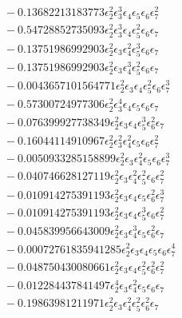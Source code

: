 \documentclass[10pt]{article}
\begin{document}
\begin{align*}
&{}  - 0.13682213183773 \epsilon_{2}^{2} \epsilon_{3}^{3} \epsilon_{4} \epsilon_{5} \epsilon_{6} \epsilon_{7}^{2} \\
&{}  - 0.54728852735093 \epsilon_{2}^{2} \epsilon_{3}^{3} \epsilon_{4} \epsilon_{5}^{2} \epsilon_{6} \epsilon_{7} \\
&{}  - 0.13751986992903 \epsilon_{2}^{2} \epsilon_{3} \epsilon_{4}^{2} \epsilon_{5}^{3} \epsilon_{6} \epsilon_{7} \\
&{}  - 0.13751986992903 \epsilon_{2}^{2} \epsilon_{3} \epsilon_{4}^{3} \epsilon_{5}^{2} \epsilon_{6} \epsilon_{7} \\
&{}  - 0.0043657101564771 \epsilon_{2}^{2} \epsilon_{3} \epsilon_{4} \epsilon_{5}^{2} \epsilon_{6} \epsilon_{7}^{3} \\
&{}  - 0.57300724977306 \epsilon_{2}^{2} \epsilon_{3}^{4} \epsilon_{4} \epsilon_{5} \epsilon_{6} \epsilon_{7} \\
&{}  - 0.076399927738349 \epsilon_{2}^{2} \epsilon_{3} \epsilon_{4} \epsilon_{5}^{3} \epsilon_{6}^{2} \epsilon_{7} \\
&{}  - 0.16044114910967 \epsilon_{2}^{2} \epsilon_{3}^{2} \epsilon_{4}^{2} \epsilon_{5} \epsilon_{6} \epsilon_{7}^{2} \\
&{}  - 0.0050933285158899 \epsilon_{2}^{2} \epsilon_{3} \epsilon_{4}^{2} \epsilon_{5} \epsilon_{6} \epsilon_{7}^{3} \\
&{}  - 0.040746628127119 \epsilon_{2}^{2} \epsilon_{3} \epsilon_{4}^{2} \epsilon_{5}^{2} \epsilon_{6} \epsilon_{7}^{2} \\
&{}  - 0.010914275391193 \epsilon_{2}^{2} \epsilon_{3} \epsilon_{4} \epsilon_{5} \epsilon_{6}^{2} \epsilon_{7}^{3} \\
&{}  - 0.010914275391193 \epsilon_{2}^{2} \epsilon_{3} \epsilon_{4} \epsilon_{5}^{3} \epsilon_{6} \epsilon_{7}^{2} \\
&{}  - 0.045839956643009 \epsilon_{2}^{2} \epsilon_{3} \epsilon_{4}^{3} \epsilon_{5} \epsilon_{6}^{2} \epsilon_{7} \\
&{}  - 0.00072761835941285 \epsilon_{2}^{2} \epsilon_{3} \epsilon_{4} \epsilon_{5} \epsilon_{6} \epsilon_{7}^{4} \\
&{}  - 0.048750430080661 \epsilon_{2}^{2} \epsilon_{3} \epsilon_{4} \epsilon_{5}^{2} \epsilon_{6}^{2} \epsilon_{7}^{2} \\
&{}  - 0.012284437841497 \epsilon_{2}^{4} \epsilon_{3} \epsilon_{4}^{2} \epsilon_{5} \epsilon_{6} \epsilon_{7} \\
&{}  - 0.19863981211971 \epsilon_{2}^{2} \epsilon_{3} \epsilon_{4}^{2} \epsilon_{5}^{2} \epsilon_{6}^{2} \epsilon_{7} \\

\end{align*}
\end{document}
